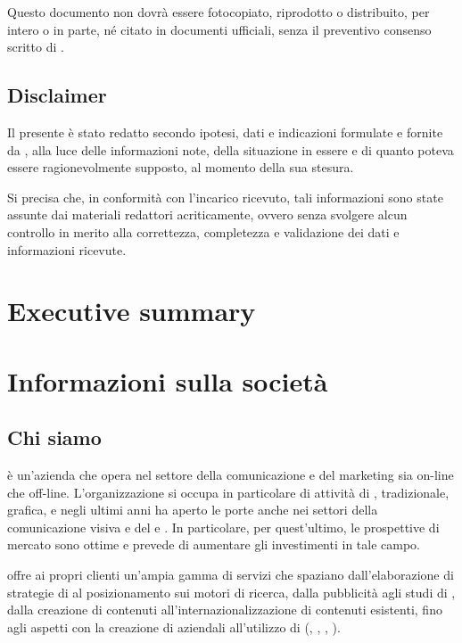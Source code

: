 Questo documento non dovrà essere fotocopiato, riprodotto o distribuito, per intero o in parte, né citato in documenti ufficiali, senza il preventivo consenso scritto di \customer.

\section{Disclaimer}
Il presente  è stato redatto secondo ipotesi, dati e indicazioni formulate e fornite da \customer, alla luce delle informazioni note, della situazione in essere e di quanto poteva essere ragionevolmente supposto, al momento della sua stesura.

Si precisa che, in conformità con l'incarico ricevuto, tali informazioni sono state assunte dai materiali redattori acriticamente, ovvero senza svolgere alcun controllo in merito alla correttezza, completezza e validazione dei dati e informazioni ricevute.

\chapter{Executive summary}\label{sec:summary}

\chapter{Informazioni sulla società}\label{sec:whoweare}

\section{Chi siamo}
\customer è un'azienda che opera nel settore della comunicazione e del marketing sia on-line che off-line. 
L'organizzazione si occupa in particolare di attività di , \mktg tradizionale, grafica, e negli ultimi anni ha aperto le porte anche nei settori della comunicazione visiva e del \mktg {} e . In particolare, per quest'ultimo, le prospettive di mercato sono ottime e \customer prevede di aumentare gli investimenti in tale campo.

\customer offre ai propri clienti un'ampia gamma di servizi che spaziano dall'elaborazione di strategie di \mktg al posizionamento sui motori di ricerca, dalla pubblicità  agli studi di , dalla creazione di contenuti all'internazionalizzazione di contenuti esistenti, fino agli aspetti  con la creazione di  aziendali all'utilizzo di  (, , , ).

